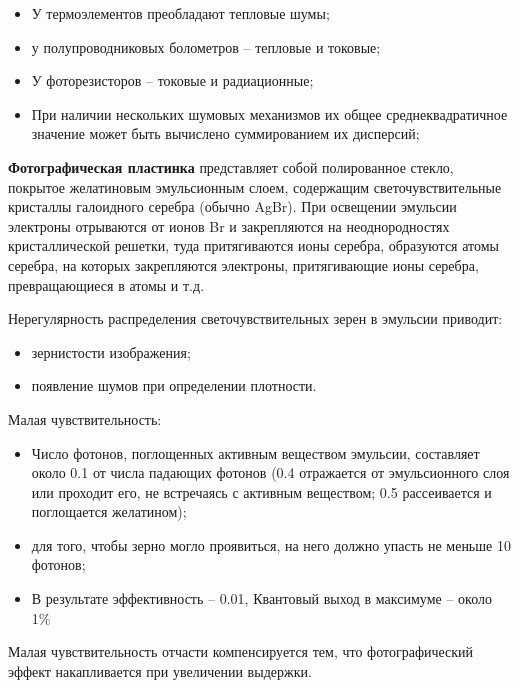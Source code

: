 \documentclass[12pt]{article}
\begin{document}
\begin{itemize}
	\item У термоэлементов преобладают тепловые шумы;
		\item у полупроводниковых болометров – тепловые и токовые;
			\item У фоторезисторов – токовые и радиационные;
				\item При наличии нескольких шумовых механизмов их общее
				среднеквадратичное значение может быть вычислено
				суммированием их дисперсий;
				
\end{itemize}

\textbf{Фотографическая пластинка} представляет собой полированное стекло,
покрытое желатиновым эмульсионным слоем, содержащим
светочувствительные кристаллы галоидного серебра (обычно AgBr).
При освещении эмульсии электроны отрываются от ионов Br и закрепляются
на неоднородностях кристаллической решетки, туда притягиваются ионы
серебра, образуются атомы серебра, на которых закрепляются электроны,
притягивающие ионы серебра, превращающиеся в атомы и т.д.

Нерегулярность распределения светочувствительных зерен в эмульсии приводит:
\begin{itemize}
\item зернистости изображения;
\item появление шумов при определении плотности.
\end{itemize}


Малая чувствительность:
\begin{itemize}
	\item Число фотонов, поглощенных активным веществом эмульсии, составляет около 0.1 от числа
	падающих фотонов (0.4 отражается от эмульсионного слоя или проходит его, не встречаясь с
	активным веществом; 0.5 рассеивается и поглощается желатином);
	\item для того, чтобы зерно могло проявиться, на него должно упасть не меньше 10 фотонов;
	\item В результате эффективность -- 0.01, Квантовый выход в максимуме – около 1\%
\end{itemize}
Малая чувствительность отчасти компенсируется тем, что фотографический эффект
накапливается при увеличении выдержки.
\end{document}
